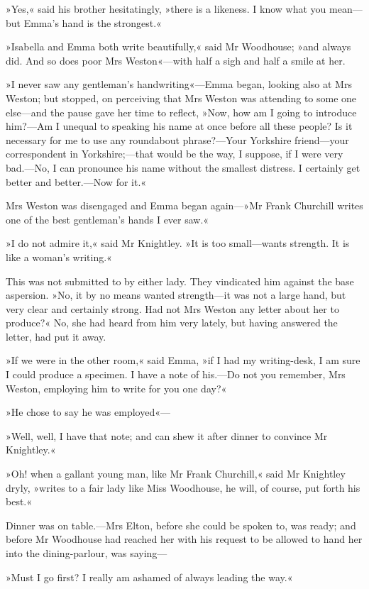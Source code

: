 »Yes,« said his brother hesitatingly, »there is a likeness. I know what you mean—but Emma's hand is the strongest.«

»Isabella and Emma both write beautifully,« said Mr Woodhouse; »and always did. And so does poor Mrs Weston«—with half a sigh and half a smile at her.

»I never saw any gentleman's handwriting«—Emma began, looking also at Mrs Weston; but stopped, on perceiving that Mrs Weston was attending to some one else—and the pause gave her time to reflect, »Now, how am I going to introduce him?—Am I unequal to speaking his name at once before all these people? Is it necessary for me to use any roundabout phrase?—Your Yorkshire friend—your correspondent in Yorkshire;—that would be the way, I suppose, if I were very bad.—No, I can pronounce his name without the smallest distress. I certainly get better and better.—Now for it.«

Mrs Weston was disengaged and Emma began again—»Mr Frank Churchill writes one of the best gentleman's hands I ever saw.«

»I do not admire it,« said Mr Knightley. »It is too small—wants strength. It is like a woman's writing.«

This was not submitted to by either lady. They vindicated him against the base aspersion. »No, it by no means wanted strength—it was not a large hand, but very clear and certainly strong. Had not Mrs Weston any letter about her to produce?« No, she had heard from him very lately, but having answered the letter, had put it away.

»If we were in the other room,« said Emma, »if I had my writing-desk, I am sure I could produce a specimen. I have a note of his.—Do not you remember, Mrs Weston, employing him to write for you one day?«

»He chose to say he was employed«—

»Well, well, I have that note; and can shew it after dinner to convince Mr Knightley.«

»Oh! when a gallant young man, like Mr Frank Churchill,« said Mr Knightley dryly, »writes to a fair lady like Miss Woodhouse, he will, of course, put forth his best.«

Dinner was on table.—Mrs Elton, before she could be spoken to, was ready; and before Mr Woodhouse had reached her with his request to be allowed to hand her into the dining-parlour, was saying—

»Must I go first? I really am ashamed of always leading the way.«

